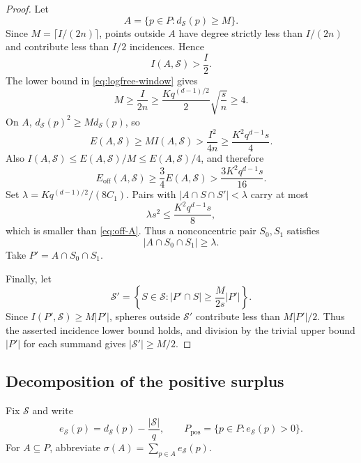 \documentclass[11pt,letterpaper]{amsart}
\theoremstyle{definition}
\theoremstyle{remark}
\newcommand{\1}{\mathbf 1}
\begin{document}
\begin{proof}
Let
\[
 A=\{p\in P:d_{\mathcal S}(p)\ge M\}.
\]
Since $M=\lceil I/(2n)\rceil$, points outside $A$ have degree strictly less than $I/(2n)$ and contribute less than $I/2$ incidences.  Hence
\begin{equation}\label{eq:IA-half}
 I(A,\mathcal S)>\frac I2.
\end{equation}
The lower bound in \eqref{eq:logfree-window} gives
\[
 M\ge\frac{I}{2n}
 \ge\frac{Kq^{(d-1)/2}}2\sqrt{\frac{s}{n}}
 \ge4.
\]
On $A$, $d_{\mathcal S}(p)^2\ge M d_{\mathcal S}(p)$, so
\[
 E(A,\mathcal S)
 \ge M I(A,\mathcal S)
 >\frac{I^2}{4n}
 \ge\frac{K^2q^{d-1}s}{4}.
\]
Also $I(A,\mathcal S)\le E(A,\mathcal S)/M\le E(A,\mathcal S)/4$, and therefore
\begin{equation}\label{eq:off-A}
 E_{\mathrm{off}}(A,\mathcal S)
 \ge\frac34E(A,\mathcal S)
 >\frac{3K^2q^{d-1}s}{16}.
\end{equation}
Set $\lambda=Kq^{(d-1)/2}/(8C_1)$.  Pairs with $|A\cap S\cap S'|<\lambda$ carry at most
\[
 \lambda s^2\le\frac{K^2q^{d-1}s}{8},
\]
which is smaller than \eqref{eq:off-A}.  Thus a nonconcentric pair $S_0,S_1$ satisfies
\[
 |A\cap S_0\cap S_1|\ge\lambda.
\]
Take $P'=A\cap S_0\cap S_1$.

Finally, let
\[
 \mathcal S'=\left\{S\in\mathcal S:
 |P'\cap S|\ge\frac{M}{2s}|P'|\right\}.
\]
Since $I(P',\mathcal S)\ge M|P'|$, spheres outside $\mathcal S'$ contribute less than $M|P'|/2$.  Thus the asserted incidence lower bound holds, and division by the trivial upper bound $|P'|$ for each summand gives $|\mathcal S'|\ge M/2$.
\end{proof}

\subsection{Decomposition of the positive surplus}

Fix $\mathcal S$ and write
\[
 e_{\mathcal S}(p)=d_{\mathcal S}(p)-\frac{|\mathcal S|}{q},
 \qquad
 P_{\mathrm{pos}}=\{p\in P:e_{\mathcal S}(p)>0\}.
\]
For $A\subseteq P$, abbreviate $\sigma(A)=\sum_{p\in A}e_{\mathcal S}(p)$.
\end{document}
